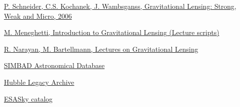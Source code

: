 \documentclass[12pt,a4paper]{article}
\begin{document}
\newpage

\begin{thebibliography}{}
    \href{https://extras.springer.com/?query=978-3-540-30309-1}{P. Schneider, C.S. Kochanek, J. Wambsganss, Gravitational Lensing: Strong, Weak and Micro, 2006}
    
    \href{https://ui.adsabs.harvard.edu/abs/2022iglp.book.....M/abstract}{M. Meneghetti, Introduction to Gravitational Lensing (Lecture scripts)}

    \href{https://arxiv.org/abs/astro-ph/9606001}{R. Narayan, M. Bartellmann, Lectures on Gravitational Lensing}

    \href{http://simbad.u-strasbg.fr/simbad/}{SIMBAD Astronomical Database}

    \href{https://hla.stsci.edu/hlaview.html}{Hubble Legacy Archive}

    \href{https://sky.esa.int}{ESASky catalog}
\end{thebibliography}
\end{document}
